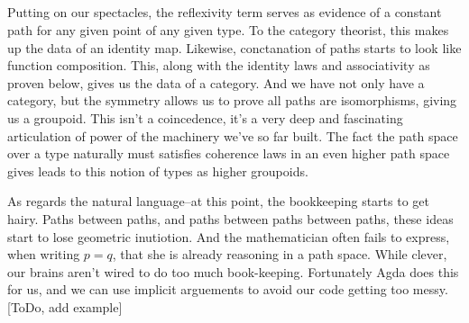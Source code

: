 \documentclass[11pt, a4paper]{article}
\begin{document}
\begin{code}
\AgdaSpace{}%
\AgdaSpace{}%
\AgdaSpace{}%
\AgdaSymbol{=}\AgdaSpace{}%
\AgdaSymbol{(}\AgdaSpace{}%
\AgdaSymbol{:}\AgdaSpace{}%
\AgdaSymbol{)}\AgdaSpace{}%
\AgdaSpace{}%
\AgdaSymbol{(}\AgdaSpace{}%
\AgdaSymbol{:}\AgdaSpace{}%
\AgdaSpace{}%
\AgdaSpace{}%
\AgdaSymbol{)}\AgdaSpace{}%
\AgdaSpace{}%
\AgdaSpace{}%
\AgdaSpace{}%
\<%
\\
%
\>[6]\AgdaSpace{}%
\AgdaSymbol{:}\AgdaSpace{}%
\AgdaSymbol{(}\AgdaSpace{}%
\AgdaSymbol{:}\AgdaSpace{}%
\AgdaSymbol{)}\AgdaSpace{}%
\AgdaSpace{}%
\AgdaSpace{}%
\AgdaSpace{}%
\AgdaSpace{}%
\<%
\\
%
\>[6]\AgdaSpace{}%
\AgdaSymbol{=}\AgdaSpace{}%
\AgdaSpace{}%
\AgdaSpace{}%
\AgdaSpace{}%
\AgdaSpace{}%
\AgdaSpace{}%
\<%
\\
%
\\[\AgdaEmptyExtraSkip]%
%
\>[2]\AgdaSpace{}%
\AgdaSpace{}%
\<%
\end{code}

Putting on our spectacles, the reflexivity term serves as evidence of a
constant path for any given point of any given type. To the category theorist,
this makes up the data of an identity map. Likewise, conctanation of paths
starts to look like function composition. This, along with the identity laws
and associativity as proven below, gives us the data of a category. And we have
not only have a category, but the symmetry allows us to prove all paths are
isomorphisms, giving us a groupoid. This isn't a coincedence, it's a very deep
and fascinating articulation of power of the machinery we've so far built. The
fact the path space over a type naturally must satisfies coherence laws in an
even higher path space gives leads to this notion of types as higher groupoids.  

As regards the natural language--at this point, the bookkeeping starts to get hairy.  Paths between paths, and paths between paths between paths, these ideas start to lose geometric inutiotion. And the mathematician often fails to express, when writing $p= q$, that she is already reasoning in a path space. While clever, our brains aren't wired to do too much book-keeping.  Fortunately Agda does this for us, and we can use implicit arguements to avoid our code getting too messy.  [ToDo, add example]
\end{document}
